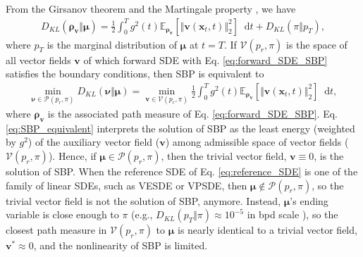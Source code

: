 \documentclass{article}
\theoremstyle{definition}
\theoremstyle{remark}
\newcommand*\diff{\mathop{}\!\mathrm{d}}
\begin{document}
	From the Girsanov theorem and the Martingale property \cite{chen2016relation}, we have
	\begin{align*}
	D_{KL}(\bm{\rho}_{\mathbf{v}}\Vert\bm{\mu})=\frac{1}{2}\int_{0}^{T}g^{2}(t)\mathbb{E}_{\bm{\rho}_{\mathbf{v}}}[\Vert\mathbf{v}(\mathbf{x}_{t},t)\Vert_{2}^{2}]\diff t+D_{KL}(\pi\Vert p_{T}),
	\end{align*}
	where $p_{T}$ is the marginal distribution of $\bm{\mu}$ at $t=T$. If $\mathcal{V}(p_{r},\pi)$ is the space of all vector fields $\mathbf{v}$ of which forward SDE with Eq. \eqref{eq:forward_SDE_SBP} satisfies the boundary conditions, then SBP is equivalent to
	\begin{align}\label{eq:SBP_equivalent}
	\min_{\bm{\nu}\in\mathcal{P}(p_{r},\pi)}D_{KL}(\bm{\nu}\Vert\bm{\mu})=\min_{\mathbf{v}\in\mathcal{V}(p_{r},\pi)}\frac{1}{2}\int_{0}^{T}g^{2}(t)\mathbb{E}_{\bm{\rho}_{\mathbf{v}}}[\Vert\mathbf{v}(\mathbf{x}_{t},t)\Vert_{2}^{2}]\diff t,
	\end{align}
	where $\bm{\rho}_{\mathbf{v}}$ is the associated path measure of Eq. \eqref{eq:forward_SDE_SBP}. Eq. \eqref{eq:SBP_equivalent} interprets the solution of SBP as the least energy (weighted by $g^{2}$) of the auxiliary vector field ($\mathbf{v}$) among admissible space of vector fields ($\mathcal{V}(p_{r},\pi)$). Hence, if $\bm{\mu}\in\mathcal{P}(p_{r},\pi)$, then the trivial vector field, $\mathbf{v}\equiv 0$, is the solution of SBP. When the reference SDE of Eq. \eqref{eq:reference_SDE} is one of the family of linear SDEs, such as VESDE or VPSDE, then $\bm{\mu}\notin\mathcal{P}(p_{r},\pi)$, so the trivial vector field is not the solution of SBP, anymore. Instead, $\bm{\mu}$'s ending variable is close enough to $\pi$ (e.g., $D_{KL}(p_{T}\Vert\pi)\approx 10^{-5}$ in bpd scale \cite{ho2020denoising}), so the closest path measure in $\mathcal{V}(p_{r},\pi)$ to $\bm{\mu}$ is nearly identical to a trivial vector field, $\mathbf{v}^{*}\approx 0$, and the nonlinearity of SBP is limited.
	
	
	
\end{document}
